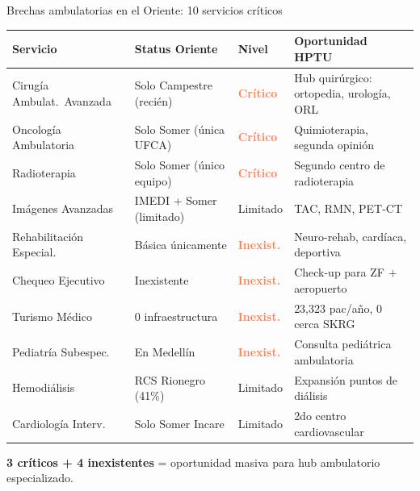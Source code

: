 \documentclass[aspectratio=169, 11pt]{beamer}
\newcommand{\danger}[1]{\textcolor{coral}{\textbf{#1}}}
\begin{document}

\begin{frame}{Brechas ambulatorias en el Oriente: 10 servicios críticos}

{\scriptsize
\begin{tabular}{@{}p{3.2cm}p{2.8cm}lp{4.2cm}@{}}
\toprule
\textbf{Servicio} & \textbf{Status Oriente} & \textbf{Nivel} & \textbf{Oportunidad HPTU} \\
\midrule
\rowcolor{coral!10}
Cirugía Ambulat.\ Avanzada & Solo Campestre (recién) & \danger{Crítico} & Hub quirúrgico: ortopedia, urología, ORL \\
\rowcolor{coral!10}
Oncología Ambulatoria & Solo Somer (única UFCA) & \danger{Crítico} & Quimioterapia, segunda opinión \\
\rowcolor{coral!10}
Radioterapia & Solo Somer (único equipo) & \danger{Crítico} & Segundo centro de radioterapia \\
Imágenes Avanzadas & IMEDI + Somer (limitado) & Limitado & TAC, RMN, PET-CT \\
\rowcolor{coral!6}
Rehabilitación Especial. & Básica únicamente & \danger{Inexist.} & Neuro-rehab, cardíaca, deportiva \\
\rowcolor{coral!6}
Chequeo Ejecutivo & Inexistente & \danger{Inexist.} & Check-up para ZF + aeropuerto \\
\rowcolor{coral!6}
Turismo Médico & 0 infraestructura & \danger{Inexist.} & 23,323 pac/año, 0 cerca SKRG \\
\rowcolor{coral!6}
Pediatría Subespec. & En Medellín & \danger{Inexist.} & Consulta pediátrica ambulatoria \\
Hemodiálisis & RCS Rionegro (41\%) & Limitado & Expansión puntos de diálisis \\
Cardiología Interv. & Solo Somer Incare & Limitado & 2do centro cardiovascular \\
\bottomrule
\end{tabular}
}

\vspace{4pt}
{\footnotesize \textbf{3 críticos + 4 inexistentes} = oportunidad masiva para hub ambulatorio especializado.}
\end{frame}
\end{document}
